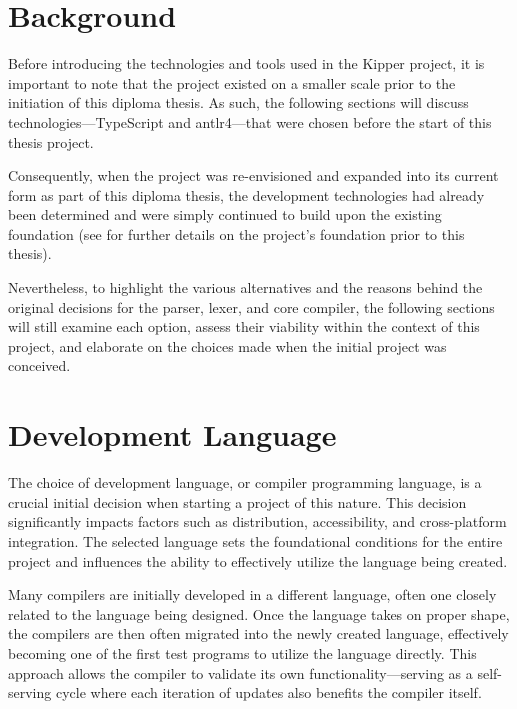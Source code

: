 \section{Background}
\label{sec:technology-background}

Before introducing the technologies and tools used in the Kipper project, it is important to note that the project existed on a smaller scale prior to the initiation of this diploma thesis. As such, the following sections will discuss technologies—TypeScript and \Gls{antlr4}—that were chosen before the start of this thesis project. 

Consequently, when the project was re-envisioned and expanded into its current form as part of this diploma thesis, the development technologies had already been determined and were simply continued to build upon the existing foundation (see  for further details on the project's foundation prior to this thesis).

Nevertheless, to highlight the various alternatives and the reasons behind the original decisions for the parser, lexer, and core compiler, the following sections will still examine each option, assess their viability within the context of this project, and elaborate on the choices made when the initial project was conceived.

\section{Development Language}
\label{sec:development-language}

The choice of development language, or compiler programming language, is a crucial initial decision when starting a project of this nature. This decision significantly impacts factors such as distribution, accessibility, and cross-platform integration. The selected language sets the foundational conditions for the entire project and influences the ability to effectively utilize the language being created.

Many compilers are initially developed in a different language, often one closely related to the language being designed. Once the language takes on proper shape, the compilers are then often migrated into the newly created language, effectively becoming one of the first test programs to utilize the language directly. This approach allows the compiler to validate its own functionality—serving as a self-serving cycle where each iteration of updates also benefits the compiler itself.

